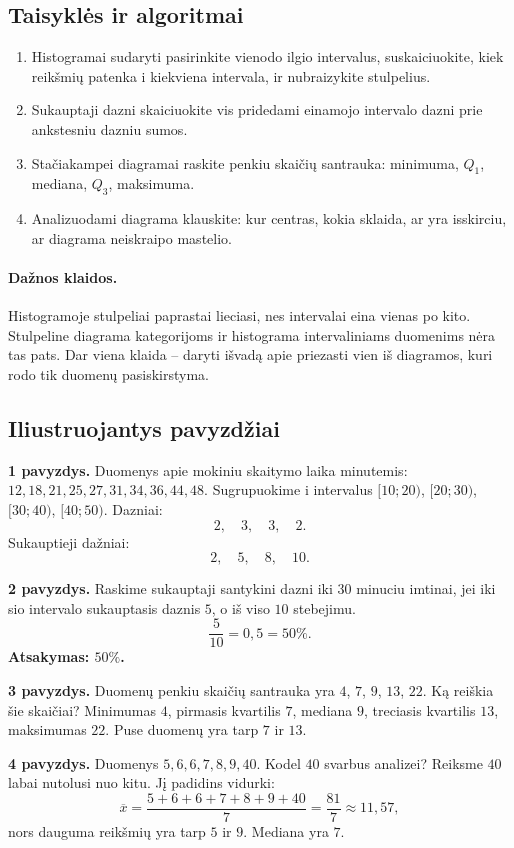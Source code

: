 \subsection{Taisyklės ir algoritmai}
\begin{enumerate}[label=\arabic*.]
\item Histogramai sudaryti pasirinkite vienodo ilgio intervalus, suskaiciuokite, kiek reikšmių patenka i kiekviena intervala, ir nubraizykite stulpelius.
\item Sukauptaji dazni skaiciuokite vis pridedami einamojo intervalo dazni prie ankstesniu dazniu sumos.
\item Stačiakampei diagramai raskite penkiu skaičių santrauka: minimuma, $Q_1$, mediana, $Q_3$, maksimuma.
\item Analizuodami diagrama klauskite: kur centras, kokia sklaida, ar yra isskirciu, ar diagrama neiskraipo mastelio.
\end{enumerate}
\paragraph{Dažnos klaidos.}
Histogramoje stulpeliai paprastai lieciasi, nes intervalai eina vienas po kito. Stulpeline diagrama kategorijoms ir histograma intervaliniams duomenims nėra tas pats. Dar viena klaida -- daryti išvadą apie priezasti vien iš diagramos, kuri rodo tik duomenų pasiskirstyma.

\subsection{Iliustruojantys pavyzdžiai}
\textbf{1 pavyzdys.} Duomenys apie mokiniu skaitymo laika minutemis: $12,18,21,25,27,31,34,36,44,48$. Sugrupuokime i intervalus $[10;20)$, $[20;30)$, $[30;40)$, $[40;50)$.
Dazniai:
\[
2,\quad 3,\quad 3,\quad 2.
\]
Sukauptieji dažniai:
\[
2,\quad 5,\quad 8,\quad 10.
\]

\textbf{2 pavyzdys.} Raskime sukauptaji santykini dazni iki $30$ minuciu imtinai, jei iki sio intervalo sukauptasis daznis $5$, o iš viso $10$ stebejimu.
\[
\frac5{10}=0{,}5=50\%.
\]
\textbf{Atsakymas: $50\%$.}

\textbf{3 pavyzdys.} Duomenų penkiu skaičių santrauka yra $4$, $7$, $9$, $13$, $22$. Ką reiškia šie skaičiai?
Minimumas $4$, pirmasis kvartilis $7$, mediana $9$, treciasis kvartilis $13$, maksimumas $22$. Puse duomenų yra tarp $7$ ir $13$.

\textbf{4 pavyzdys.} Duomenys $5,6,6,7,8,9,40$. Kodel $40$ svarbus analizei?
Reiksme $40$ labai nutolusi nuo kitu. Jį padidins vidurki:
\[
\overline{x}=\frac{5+6+6+7+8+9+40}{7}=\frac{81}{7}\approx11{,}57,
\]
nors dauguma reikšmių yra tarp $5$ ir $9$. Mediana yra $7$.

